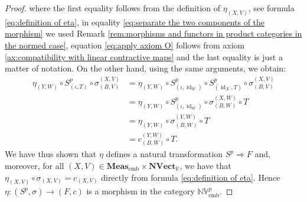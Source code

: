 \documentclass{amsart}
\theoremstyle{definition}
\theoremstyle{plain}
\newcommand{\id}{\operatorname{id}}
\newcommand{\embMeas}{\mathbf{Meas}_\mathrm{emb}}
\newcommand{\NVect}{\mathbf{NVect}_{\mathbb{K}}}
\newcommand{\NVembp}{\mathbb{NV}_{\mathrm{emb}}^p}
\begin{document}
\begin{proof}
            where the first equality follows from the definition of $\eta_{(X,V)}$, see formula \eqref{eq:definition of eta}, in equality \eqref{eq:separate the two components of the morphism} we used Remark \ref{rem:morphisms and functors in product categories in the normed case}, equation \eqref{eq:apply axiom O} follows from axiom \ref{ax:compatibility with linear contractive maps} and the last equality is just a matter of notation.
            On the other hand, using the same arguments, we obtain:
            \begin{align*}
                \eta_{(Y,W)} \circ S^p_{(\iota,T)} \circ \sigma_{(B,V)}^{(X,V)} &= \eta_{(Y,W)} \circ S^p_{(\iota,\id_W)} \circ S^p_{(\id_X,T)} \circ \sigma_{(B,V)}^{(X,V)} \\
                &= \eta_{(Y,W)} \circ S^p_{(\iota,\id_W)} \circ \sigma_{(B,W)}^{(X,W)} \circ T \\
                &= \eta_{(Y,W)} \circ \sigma_{(B,W)}^{(Y,W)} \circ T \\
                &= c_{(B,W)}^{(Y,W)} \circ T.
            \end{align*}
            We have thus shown that $\eta$ defines a natural transformation $S^p \Rightarrow F$ and, moreover, for all $(X,V) \in \embMeas \times \NVect$, we have that $\eta_{(X,V)} \circ \sigma_{(X,V)} = c_{(X,V)}$ directly from formula \eqref{eq:definition of eta}. 
            Hence $\eta \colon (S^p,\sigma) \rightarrow (F,c)$ is a morphism in the category $\NVembp$.


\end{proof}
\end{document}
